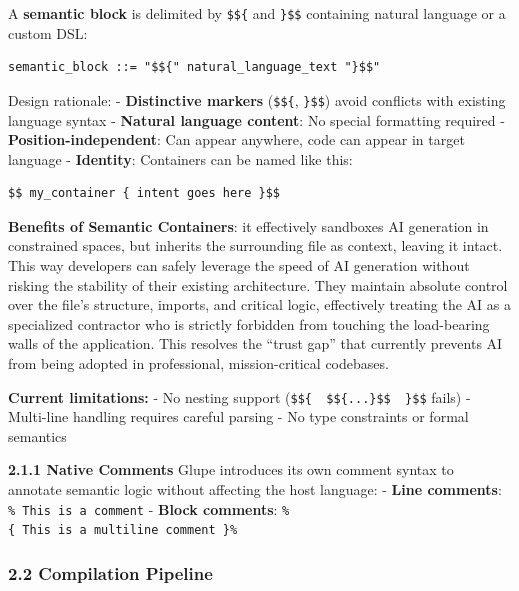 \documentclass[11pt, a4paper]{article}
\begin{document}
A \textbf{semantic block} is delimited by \texttt{\$\$\{} and
\texttt{\}\$\$} containing natural language or a custom DSL:

\begin{verbatim}
semantic_block ::= "$${" natural_language_text "}$$"
\end{verbatim}

Design rationale: - \textbf{Distinctive markers} (\texttt{\$\$\{},
\texttt{\}\$\$}) avoid conflicts with existing language syntax -
\textbf{Natural language content}: No special formatting required -
\textbf{Position-independent}: Can appear anywhere, code can appear in
target language - \textbf{Identity}: Containers can be named like this:

\begin{verbatim}
$$ my_container { intent goes here }$$
\end{verbatim}

\textbf{Benefits of Semantic Containers}: it effectively sandboxes AI
generation in constrained spaces, but inherits the surrounding file as
context, leaving it intact. This way developers can safely leverage the
speed of AI generation without risking the stability of their existing
architecture. They maintain absolute control over the file's structure,
imports, and critical logic, effectively treating the AI as a
specialized contractor who is strictly forbidden from touching the
load-bearing walls of the application. This resolves the ``trust gap''
that currently prevents AI from being adopted in professional,
mission-critical codebases.

\textbf{Current limitations:} - No nesting support
(\texttt{\$\$\{\ \ \$\$\{...\}\$\$\ \ \}\$\$} fails) - Multi-line
handling requires careful parsing - No type constraints or formal
semantics

\textbf{2.1.1 Native Comments} Glupe introduces its own comment syntax
to annotate semantic logic without affecting the host language: -
\textbf{Line comments}: \texttt{\%\ This\ is\ a\ comment} -
\textbf{Block comments}:
\texttt{\%\{\ This\ is\ a\ multiline\ comment\ \}\%}

\subsubsection{2.2 Compilation Pipeline}\label{compilation-pipeline}
\end{document}
